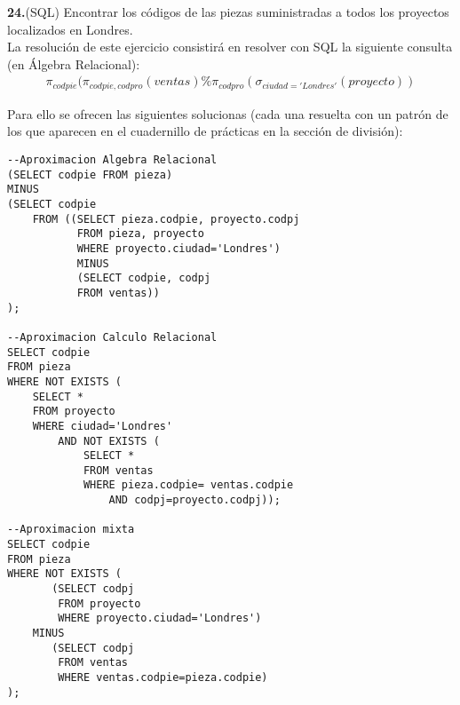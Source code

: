 \documentclass[12pt]{article}
\begin{document}
\portada[%
        titulo=Fundamentos de Bases de Datos,
        subtitulo=Ejercicio 3.24 (SQL),
        autor=Jesús Muñoz Velasco,
        año=Curso 2024-2025]

\setcounter{ejercicio}{2}
\begin{ejercicio}\hspace{-0.15cm}\textbf{24.}(SQL) Encontrar los códigos de las piezas suministradas a todos los proyectos
    localizados en Londres.\\

    La resolución de este ejercicio consistirá en resolver con SQL la siguiente consulta (en Álgebra Relacional):
    \begin{align*}
        \pi_{codpie}(\pi_{codpie, codpro}(ventas) \% \pi_{codpro}(\sigma_{ciudad='Londres'}(proyecto))
    \end{align*}

    Para ello se ofrecen las siguientes solucionas (cada una resuelta con un patrón de los que aparecen en el cuadernillo de prácticas en la sección de división):

    \begin{verbatim}
--Aproximacion Algebra Relacional
(SELECT codpie FROM pieza)
MINUS
(SELECT codpie
    FROM ((SELECT pieza.codpie, proyecto.codpj
           FROM pieza, proyecto
           WHERE proyecto.ciudad='Londres')
           MINUS
           (SELECT codpie, codpj
           FROM ventas))
);

--Aproximacion Calculo Relacional
SELECT codpie
FROM pieza
WHERE NOT EXISTS (
    SELECT *
    FROM proyecto
    WHERE ciudad='Londres'
        AND NOT EXISTS (
            SELECT *
            FROM ventas
            WHERE pieza.codpie= ventas.codpie
                AND codpj=proyecto.codpj));

--Aproximacion mixta
SELECT codpie 
FROM pieza
WHERE NOT EXISTS (
       (SELECT codpj 
        FROM proyecto
        WHERE proyecto.ciudad='Londres')
    MINUS
       (SELECT codpj 
        FROM ventas 
        WHERE ventas.codpie=pieza.codpie)
);
    \end{verbatim}


\end{ejercicio}
    
\end{document}
